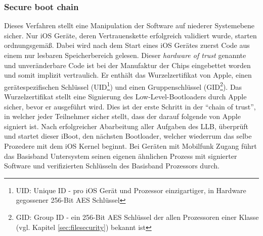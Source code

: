 	\subsubsection{Secure boot chain}\label{sec:secure-boot-chain}
		Dieses Verfahren stellt eine Manipulation der Software auf niederer
		Systemebene sicher.
		Nur iOS Geräte, deren Vertrauenskette erfolgreich validiert wurde, starten
		ordnungsgemäß. Dabei wird nach dem Start eines iOS Gerätes zuerst Code aus
		einem nur lesbaren Speicherbereich gelesen. Dieser \textit{hardware of
		trust} genannte und unveränderbare Code ist bei der
		Manufaktur der Chips eingebettet worden und somit implizit vertraulich.
		Er enthält das Wurzelzertifikat von Apple, einen gerätespezifischen
		Schlüssel (UID\footnote{UID: Unique ID - pro iOS Gerät und Prozessor einzigartiger,
		in Hardware gegossener 256-Bit AES Schlüssel}) und einen Gruppenschlüssel
		(GID\footnote{GID: Group ID - ein 256-Bit AES Schlüssel der allen
		Prozessoren einer Klasse (vgl. Kapitel \ref{sec:filesecurity}) bekannt ist}).
		Das Wurzelzertifikat stellt eine Signierung des Low-Level-Bootloaders durch Apple sicher, bevor er ausgeführt wird.
		Dies ist der erste Schritt in der "`chain of trust"', in welcher jeder
		Teilnehmer sicher stellt, dass der darauf folgende von Apple signiert ist. 		
		Nach erfolgreicher Abarbeitung aller Aufgaben des LLB, überprüft und startet
		dieser iBoot, den nächsten Bootloader, welcher wiederrum das selbe Prozedere
		mit dem iOS Kernel beginnt. Bei Geräten mit Mobilfunk Zugang führt das
		Basisband Untersystem seinen eigenen ähnlichen Prozess mit signierter 
		Software und verifizierten Schlüsseln des Basisband Prozessors durch.
		
